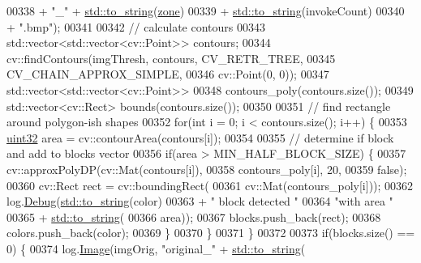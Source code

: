 \begin{DoxyCode}
00338                     + \textcolor{stringliteral}{"\_"} + \hyperlink{namespacestd_aa5ddf582a1c96ffe258c997be9a294a3}{std::to\_string}(\hyperlink{classChipChipArray_1_1Grabber_ab57efe6e0b6f369b19528285a278d967}{zone})
00339                     + \hyperlink{namespacestd_aa5ddf582a1c96ffe258c997be9a294a3}{std::to\_string}(invokeCount)
00340                     + \textcolor{stringliteral}{".bmp"});
00341 
00342             \textcolor{comment}{// calculate contours}
00343             std::vector<std::vector<cv::Point>> contours;
00344             cv::findContours(imgThresh, contours, CV\_RETR\_TREE,
00345                     CV\_CHAIN\_APPROX\_SIMPLE,
00346                     cv::Point(0, 0));
00347             std::vector<std::vector<cv::Point>>
00348                 contours\_poly(contours.size());
00349             std::vector<cv::Rect> bounds(contours.size());
00350 
00351             \textcolor{comment}{// find rectangle around polygon-ish shapes}
00352             \textcolor{keywordflow}{for}(\textcolor{keywordtype}{int} i = 0; i < contours.size(); i++) \{
00353                 \hyperlink{definitions_8hpp_a1134b580f8da4de94ca6b1de4d37975e}{uint32} area = cv::contourArea(contours[i]);
00354 
00355                 \textcolor{comment}{// determine if block and add to blocks vector}
00356                 \textcolor{keywordflow}{if}(area > MIN\_HALF\_BLOCK\_SIZE) \{
00357                     cv::approxPolyDP(cv::Mat(contours[i]),
00358                             contours\_poly[i], 20,
00359                             \textcolor{keyword}{false});
00360                     cv::Rect rect = cv::boundingRect(
00361                             cv::Mat(contours\_poly[i]));
00362                     log.\hyperlink{classChipChipArray_1_1Log_ac32b435af1577e4ebc67af2bdfea8eff}{Debug}(\hyperlink{namespacestd_aa5ddf582a1c96ffe258c997be9a294a3}{std::to\_string}(color)
00363                             + \textcolor{stringliteral}{" block detected "}
00364                             \textcolor{stringliteral}{"with area "}
00365                             + \hyperlink{namespacestd_aa5ddf582a1c96ffe258c997be9a294a3}{std::to\_string}(
00366                                 area));
00367                     blocks.push\_back(rect);
00368                     colors.push\_back(color);
00369                 \}
00370             \}
00371         \}
00372 
00373         \textcolor{keywordflow}{if}(blocks.size() == 0) \{
00374             log.\hyperlink{classChipChipArray_1_1Log_a65bbab057c8b1453f9e4efcfee7522c4}{Image}(imgOrig, \textcolor{stringliteral}{"original\_"} + \hyperlink{namespacestd_aa5ddf582a1c96ffe258c997be9a294a3}{std::to\_string}(

\end{DoxyCode}
